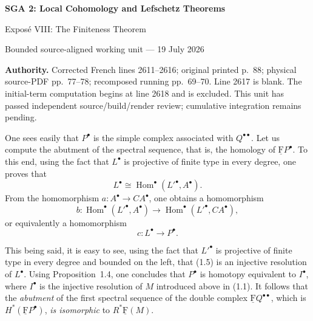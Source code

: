 \documentclass[10pt,a4paper]{article}
\newcommand{\uF}{\underline{\mathrm F}}
\begin{document}
\begin{center}
  {\Large\bfseries SGA 2: Local Cohomology and Lefschetz Theorems}\par\smallskip
  {\large Expos\'e VIII: The Finiteness Theorem}\par
  \small Bounded source-aligned working unit --- 19 July 2026
\end{center}
\noindent\colorbox{softgray}{\parbox{0.95\linewidth}{\footnotesize\textbf{Authority.}
Corrected French lines 2611--2616; original printed p.~88; physical
source-PDF pp.~77--78; recomposed running pp.~69--70. Line 2617 is blank.
The initial-term computation begins at line 2618 and is excluded. This unit
has passed independent source/build/render review; cumulative integration
remains pending.}}

One sees easily that $P^\bullet$ is the simple complex associated with
$Q^{\bullet\bullet}$. Let us compute the abutment of the spectral sequence,
that is, the homology of $\uF P^\bullet$. To this end, using the fact that
$L^\bullet$ is projective of finite type in every degree, one proves that
\[
  L^\bullet \cong \operatorname{Hom}^\bullet({L'}^\bullet,A^\bullet).
\]
From the homomorphism $a\colon A^\bullet\to CA^\bullet$, one obtains a
homomorphism
\[
  b\colon \operatorname{Hom}^\bullet({L'}^\bullet,A^\bullet)
  \longrightarrow \operatorname{Hom}^\bullet({L'}^\bullet,CA^\bullet),
\]
or equivalently a homomorphism
\begin{equation}
  c\colon L^\bullet\longrightarrow P^\bullet.
\end{equation}

This being said, it is easy to see, using the fact that ${L'}^\bullet$ is
projective of finite type in every degree and bounded on the left, that
(1.5) is an injective resolution of $L^\bullet$. Using Proposition~1.4, one
concludes that $P^\bullet$ is homotopy equivalent to $I^\bullet$, where
$I^\bullet$ is the injective resolution of $M$ introduced above in (1.1).
It follows that the \emph{abutment} of the first spectral sequence of the
double complex $\uF Q^{\bullet\bullet}$, which is
$H^*(\uF P^\bullet)$, \emph{is isomorphic} to $R^*\uF(M)$.
\end{document}
